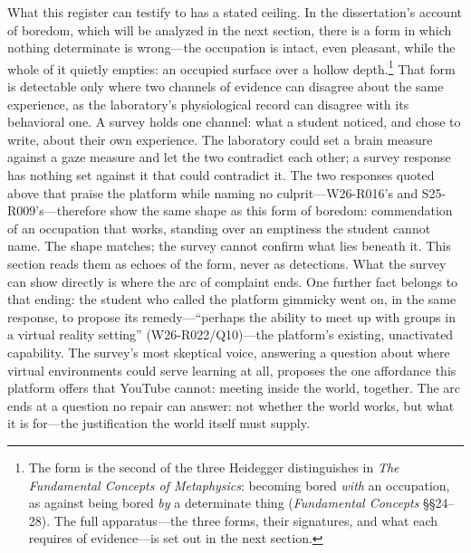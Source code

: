 What this register can testify to has a stated ceiling. In the
dissertation's account of boredom, which will be analyzed in the next
section, there is a form in which nothing determinate is
wrong---the occupation is intact, even pleasant, while the whole of it
quietly empties: an occupied surface over a hollow depth.\footnote{The
form is the second of the three Heidegger distinguishes in \textit{The
Fundamental Concepts of Metaphysics}: becoming bored \textit{with} an
occupation, as against being bored \textit{by} a determinate thing
(\textit{Fundamental Concepts} \S\S24--28). The full apparatus---the
three forms, their signatures, and what each requires of
evidence---is set out in the next section.} That form is detectable
only where two channels of evidence can disagree about the same
experience, as the laboratory's physiological record can disagree with
its behavioral one. A survey holds one channel: what a student
noticed, and chose to write, about their own experience. The
laboratory could set a brain measure against a gaze measure and let
the two contradict each other; a survey response has nothing set
against it that could contradict it. The two responses quoted above
that praise the platform while naming no culprit---W26-R016's and
S25-R009's---therefore show the same shape as this form of boredom:
commendation of an occupation that works, standing over an emptiness
the student cannot name. The shape matches; the survey cannot confirm
what lies beneath it. This section reads them as echoes of the form,
never as detections. What the survey can show directly is where the
arc of complaint ends. One further fact belongs to that ending: the
student who called the platform gimmicky went on, in the same
response, to propose its remedy---``perhaps the ability to meet up
with groups in a virtual reality setting'' (W26-R022/Q10)---the
platform's existing, unactivated capability. The survey's most
skeptical voice, answering a question about where virtual environments
could serve learning at all, proposes the one affordance this platform
offers that YouTube cannot: meeting inside the world, together. The
arc ends at a question no repair can answer: not whether the world
works, but what it is for---the justification the world itself must
supply.
